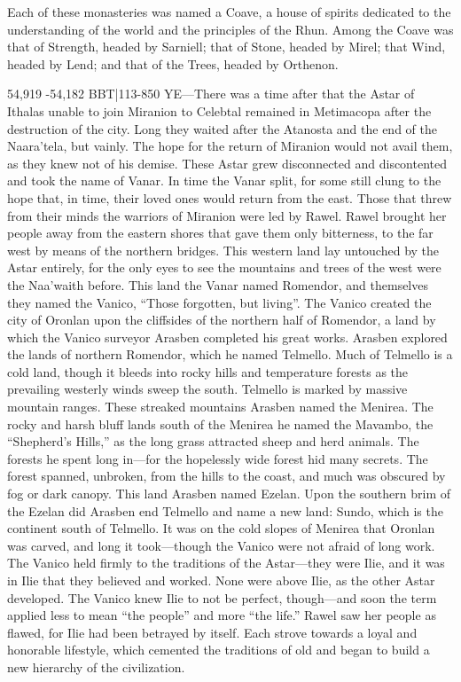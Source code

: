 \documentclass[smalldemyvopaper,11pt,twoside,onecolumn,openright,extrafontsizes]{memoir}
\begin{document}
Each of these monasteries was named a Coave, a house of spirits dedicated to the understanding of the world and the principles of the Rhun. Among the Coave was that of Strength, headed by Sarniell; that of Stone, headed by Mirel; that Wind, headed by Lend; and that of the Trees, headed by Orthenon. 

54,919 -54,182 BBT|113-850 YE—There was a time after that the Astar of Ithalas unable to join Miranion to Celebtal remained in Metimacopa after the destruction of the city. Long they waited after the Atanosta and the end of the Naara’tela, but vainly. The hope for the return of Miranion would not avail them, as they knew not of his demise. These Astar grew disconnected and discontented and took the name of Vanar. In time the Vanar split, for some still clung to the hope that, in time, their loved ones would return from the east. Those that threw from their minds the warriors of Miranion were led by Rawel. 
Rawel brought her people away from the eastern shores that gave them only bitterness, to the far west by means of the northern bridges. This western land lay untouched by the Astar entirely, for the only eyes to see the mountains and trees of the west were the Naa’waith before. This land the Vanar named Romendor, and themselves they named the Vanico, “Those forgotten, but living”. The Vanico created the city of Oronlan upon the cliffsides of the northern half of Romendor, a land by which the Vanico surveyor Arasben completed his great works. Arasben explored the lands of northern Romendor, which he named Telmello. Much of Telmello is a cold land, though it bleeds into rocky hills and temperature forests as the prevailing westerly winds sweep the south. Telmello is marked by massive mountain ranges. These streaked mountains Arasben named the Menirea. The rocky and harsh bluff lands south of the Menirea he named the Mavambo, the “Shepherd’s Hills,” as the long grass attracted sheep and herd animals. The forests he spent long in—for the hopelessly wide forest hid many secrets. The forest spanned, unbroken, from the hills to the coast, and much was obscured by fog or dark canopy. This land Arasben named Ezelan. Upon the southern brim of the Ezelan did Arasben end Telmello and name a new land: Sundo, which is the continent south of Telmello. It was on the cold slopes of Menirea that Oronlan was carved, and long it took—though the Vanico were not afraid of long work.
The Vanico held firmly to the traditions of the Astar—they were Ilie, and it was in Ilie that they believed and worked. None were above Ilie, as the other Astar developed. The Vanico knew Ilie to not be perfect, though—and soon the term applied less to mean “the people” and more “the life.” Rawel saw her people as flawed, for Ilie had been betrayed by itself.  Each strove towards a loyal and honorable lifestyle, which cemented the traditions of old and began to build a new hierarchy of the civilization.
\end{document}
